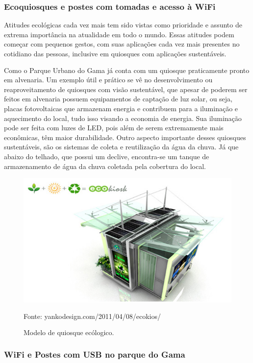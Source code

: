 \subsubsection{Ecoquiosques e postes com tomadas e acesso à WiFi}
	
	Atitudes ecológicas cada vez mais tem sido vistas como prioridade e assunto de extrema importância na atualidade em todo o mundo. Essas atitudes podem começar com pequenos gestos, com suas aplicações cada vez mais presentes no cotidiano das pessoas, inclusive em quiosques com aplicações sustentáveis.

	Como o  Parque Urbano do Gama já conta com um quiosque praticamente pronto em alvenaria. Um exemplo útil e prático se vê no desenvolvimento ou reaproveitamento de quiosques com visão sustentável, que apesar de poderem ser feitos em alvenaria possuem equipamentos de captação de luz solar, ou seja, placas fotovoltaicas que armazenam energia e contribuem para a iluminação e aquecimento do local,  tudo isso visando a economia de energia. Sua iluminação pode ser feita com luzes de LED, pois além de serem extremamente mais econômicas, têm maior durabilidade. Outro aspecto importante desses quiosques sustentáveis, são os sistemas de coleta e reutilização da água da chuva. Já que abaixo do telhado, que possui um declive, encontra-se um tanque de armazenamento de água da chuva coletada pela cobertura do local.
	
\begin{figure}[H]
	 \centering
	\label{Modelo de quiosque ecólogico}
	 \includegraphics[keepaspectratio=true,scale=0.8]{interacao/24.png}
	 \caption{Modelo de quiosque ecólogico.}
	 \small{Fonte: yankodesign.com/2011/04/08/ecokios/}
\end{figure}

\subsubsection{WiFi e Postes com USB no parque do Gama}
	
